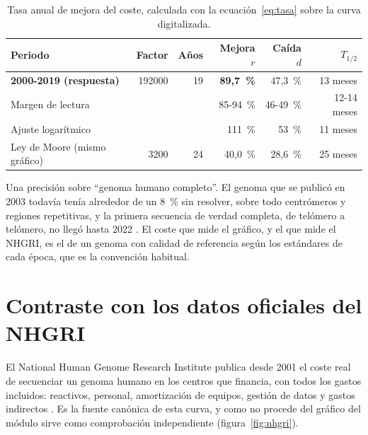 \documentclass[11pt,letterpaper]{article}
\begin{document}
\begin{table}[htbp]
\centering
\small
\renewcommand{\arraystretch}{1.2}
\begin{tabular}{@{}lrrrrr@{}}
\toprule
\textbf{Periodo} & \textbf{Factor} & \textbf{Años} & \textbf{Mejora $r$} &
  \textbf{Caída $d$} & \textbf{$T_{1/2}$} \\
\midrule
\textbf{2000-2019 (respuesta)} & \num{192000} & 19 & \textbf{89,7~\%} &
  47,3~\% & 13 meses \\
\quad Margen de lectura & & & 85-94~\% & 46-49~\% & 12-14 meses \\
\quad Ajuste logarítmico & & & 111~\% & 53~\% & 11 meses \\
\midrule
Ley de Moore (mismo gráfico) & \num{3200} & 24 & 40,0~\% & 28,6~\% &
  25 meses \\
\bottomrule
\end{tabular}
\caption{Tasa anual de mejora del coste, calculada con la
ecuación~\eqref{eq:tasa} sobre la curva digitalizada.}
\label{tab:calculo}
\end{table}

Una precisión sobre \enquote{genoma humano completo}. El genoma que se
publicó en 2003 todavía tenía alrededor de un 8~\% sin resolver, sobre todo
centrómeros y regiones repetitivas, y la primera secuencia de verdad completa,
de telómero a telómero, no llegó hasta 2022 \parencite{nurk2022}. El coste que
mide el gráfico, y el que mide el NHGRI, es el de un genoma con calidad de
referencia según los estándares de cada época, que es la convención habitual.

\section{Contraste con los datos oficiales del NHGRI}
\label{sec:nhgri}

El National Human Genome Research Institute publica desde 2001 el coste real
de secuenciar un genoma humano en los centros que financia, con todos los
gastos incluidos: reactivos, personal, amortización de equipos, gestión de
datos y gastos indirectos \parencite{nhgri2023}. Es la fuente canónica de esta
curva, y como no procede del gráfico del módulo sirve como comprobación
independiente (figura~\ref{fig:nhgri}).
\end{document}
